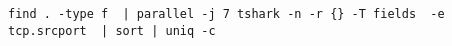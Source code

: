 
\begin{lstlisting}
find . -type f  | parallel -j 7 tshark -n -r {} -T fields  -e tcp.srcport  | sort | uniq -c 
\end{lstlisting}
